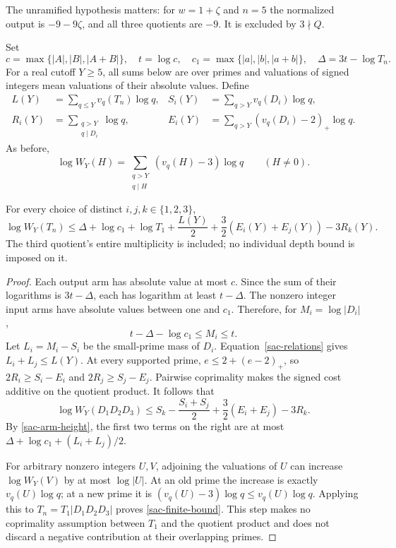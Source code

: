 The unramified hypothesis matters: for $w=1+\zeta$ and $n=5$ the
normalized output is $-9-9\zeta$, and all three quotients are $-9$.
It is excluded by $3\nmid Q$.

Set
\[
 c=\max\{|A|,|B|,|A+B|\},\quad t=\log c,\quad
 c_1=\max\{|a|,|b|,|a+b|\},\quad \Delta=3t-\log T_n.
\]
For a real cutoff $Y\ge5$, all sums below are over primes and valuations
of signed integers mean valuations of their absolute values. Define
\begin{align*}
 L(Y)&=\sum_{q\le Y}v_q(T_n)\log q,&
 S_i(Y)&=\sum_{q>Y}v_q(D_i)\log q,\\
 R_i(Y)&=\sum_{\substack{q>Y\\q\mid D_i}}\log q,&
 E_i(Y)&=\sum_{q>Y}(v_q(D_i)-2)_+\log q.
\end{align*}
As before,
\[
 \log W_Y(H)=\sum_{\substack{q>Y\\q\mid H}}(v_q(H)-3)\log q
 \qquad(H\ne0).
\]

\begin{theorem}\label{sac-finite}
For every choice of distinct $i,j,k\in\{1,2,3\}$,
\begin{equation}\label{sac-finite-bound}
 \log W_Y(T_n)\le
 \Delta+\log c_1+\log T_1+\frac{L(Y)}2
       +\frac32(E_i(Y)+E_j(Y))-3R_k(Y).
\end{equation}
The third quotient's entire multiplicity is included; no individual
depth bound is imposed on it.
\end{theorem}
\begin{proof}
Each output arm has absolute value at most $c$. Since the sum of their
logarithms is $3t-\Delta$, each has logarithm at least $t-\Delta$.
The nonzero integer input arms have absolute values between one and
$c_1$. Therefore, for $M_i=\log|D_i|$,
\begin{equation}\label{sac-arm-height}
 t-\Delta-\log c_1\le M_i\le t.
\end{equation}
Let $L_i=M_i-S_i$ be the small-prime mass of $D_i$.
Equation~\eqref{sac-relations} gives $L_i+L_j\le L(Y)$.
At every supported prime, $e\le2+(e-2)_+$, so
$2R_i\ge S_i-E_i$ and $2R_j\ge S_j-E_j$.
Pairwise coprimality makes the signed cost additive on the quotient
product. It follows that
\[
 \log W_Y(D_1D_2D_3)
 \le S_k-\frac{S_i+S_j}{2}+\frac32(E_i+E_j)-3R_k.
\]
By \eqref{sac-arm-height}, the first two terms on the right are at most
$\Delta+\log c_1+(L_i+L_j)/2$.

For arbitrary nonzero integers $U,V$, adjoining the valuations of $U$
can increase $\log W_Y(V)$ by at most $\log|U|$. At an old prime the
increase is exactly $v_q(U)\log q$; at a new prime it is
$(v_q(U)-3)\log q\le v_q(U)\log q$. Applying this to
$T_n=T_1|D_1D_2D_3|$ proves \eqref{sac-finite-bound}. This step makes
no coprimality assumption between $T_1$ and the quotient product and
does not discard a negative contribution at their overlapping primes.
\end{proof}

